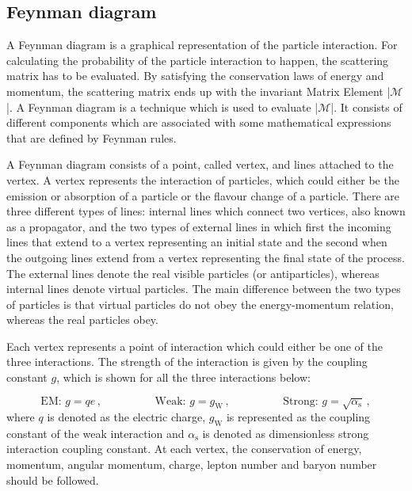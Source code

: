 \subsection{Feynman diagram}%
\label{sec:theory:standardmodel:feynmandiagram}
A Feynman diagram is a graphical representation of the particle interaction. For calculating the probability of the particle interaction to happen, the scattering matrix has to be evaluated. By satisfying the conservation laws of energy and momentum, the scattering matrix ends up with the invariant Matrix Element |$\mathcal{M}$|. A Feynman diagram is a technique which is used to evaluate |$\mathcal{M}$|. It consists of different components which are associated with some mathematical expressions that are defined by Feynman rules.~\cite{thesis:rui}

A Feynman diagram consists of a point, called vertex, and lines attached to the vertex. A vertex represents the interaction of particles, which could either be the emission or absorption of a particle or the flavour change of a particle. There are three different types of lines: internal lines which connect two vertices, also known as a propagator, and the two types of external lines in which first the incoming lines that extend to a vertex representing an initial state and the second when the outgoing lines extend from a vertex representing the final state of the process. The external lines denote the real visible particles (or antiparticles), whereas internal lines denote virtual particles. The main difference between the two types of particles is that virtual particles do not obey the energy-momentum relation, whereas the real particles obey. 

Each vertex represents a point of interaction which could either be one of the three interactions. The strength of the interaction is given by the coupling constant $g$, which is shown for all the three interactions below:

\[\text{EM: }g = qe \,, \hspace{2cm} \text{Weak: }g = g_{\text{W}} \,, \hspace{2cm} \text{Strong: }g = \sqrt{\alpha_{\text{s}}} \,, \]
where $q$ is denoted as the electric charge, $g_{\text{W}}$ is represented as the coupling constant of the weak interaction and $\alpha_{\text{s}}$ is denoted as dimensionless strong interaction coupling constant. At each vertex, the conservation of energy, momentum, angular momentum, charge, lepton number and baryon number should be followed.


